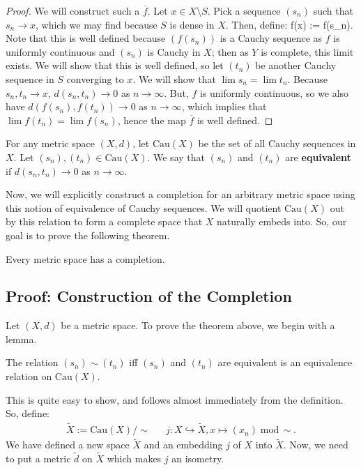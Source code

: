 	\begin{proof}
		We will construct such a $\overline f$. Let $x\in X\setminus S$. Pick a sequence $(s_n)$ such that $s_n\rightarrow x$, which we may find because 
		$S$ is dense in $X$. Then, define:
		\eq
			\overline f(x) := \lim f(s_n).
		\qe
		Note that this is well defined because $(f(s_n))$ is a Cauchy sequence as $f$ is uniformly continuous and $(s_n)$ is Cauchy in $X$; then as $Y$ is 
		complete, this limit exists. We will show that this is well defined, so let $(t_n)$ be another Cauchy sequence in $S$ converging to $x$. We will show 
		that $\lim s_n = \lim t_n$. Because $s_n, t_n\rightarrow x$, $d(s_n, t_n)\rightarrow 0$ as $n\rightarrow\infty$. But, $f$ is uniformly continuous, so we 
		also have $d(f(s_n), f(t_n))\rightarrow 0$ as $n\rightarrow\infty$, which implies that $\lim f(t_n) = \lim f(s_n)$, hence the map $\overline f$ is well 
		defined.
	\end{proof}
	
	\begin{definition}
		For any metric space $(X, d)$, let $\mathrm{Cau}(X)$ be the set of all Cauchy sequences in $X$. Let $(s_n), (t_n)\in \mathrm{Cau}(X)$. We say that $(s_n)$ and $(t_n)$ are \textbf{equivalent} if $d(s_n, t_n)\rightarrow 0$ as $n\rightarrow\infty$. 
	\end{definition}
	
	Now, we will explicitly construct a completion for an arbitrary metric space using this notion of equivalence of Cauchy sequences. We will quotient $\mathrm{Cau}(X)$ out by this relation to form a complete space that $X$ naturally embeds into. So, our goal is to prove the following theorem.
	
	\begin{theorem}
		Every metric space has a completion.
	\end{theorem}
	
	\subsection{Proof: Construction of the Completion}
	
	Let $(X, d)$ be a metric space. To prove the theorem above, we begin with a lemma.
	
	\begin{lemma}
		The relation $(s_n)\sim (t_n)$ iff $(s_n)$ and $(t_n)$ are equivalent is an equivalence relation on $\mathrm{Cau}(X)$.
	\end{lemma}
	
	This is quite easy to show, and follows almost immediately from the definition. So, define:
	\begin{align}
		\tilde X := \mathrm{Cau}(X) / \sim && j : X\hookrightarrow\tilde X, x\mapsto (x_n)\; \mathrm{mod}\, \sim.
	\end{align}
	We have defined a new space $\tilde X$ and an embedding $j$ of $X$ into $\tilde X$. Now, we need to put a metric $\tilde d$ on 
	$\tilde X$ which makes $j$ an isometry.
	
